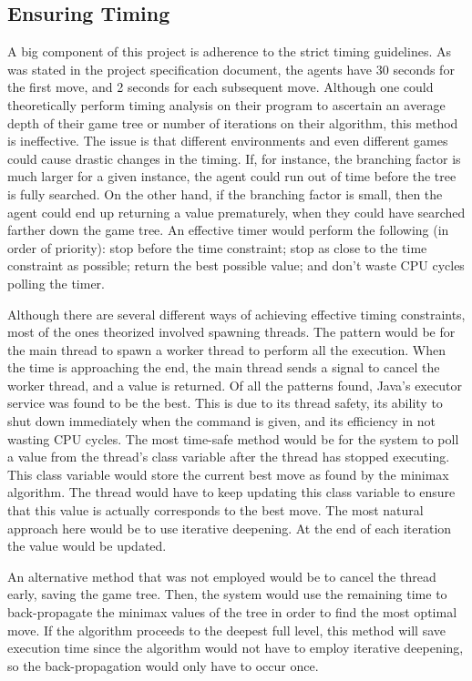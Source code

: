 \documentclass[]{article}
\begin{document}
\subsection{Ensuring Timing}
A big component of this project is adherence to the strict timing guidelines. As was stated in the project specification document, the agents have 30 seconds for the first move, and 2 seconds for each subsequent move. Although one could theoretically perform timing analysis on their program to ascertain an average depth of their game tree or number of iterations on their algorithm, this method is ineffective. The issue is that different environments and even different games could cause drastic changes in the timing. If, for instance, the branching factor is much larger for a given instance, the agent could run out of time before the tree is fully searched. On the other hand, if the branching factor is small, then the agent could end up returning a value prematurely, when they could have searched farther down the game tree. An effective timer would perform the following (in order of priority): stop before the time constraint; stop as close to the time constraint as possible; return the best possible value; and don't waste CPU cycles polling the timer.

Although there are several different ways of achieving effective timing constraints, most of the ones theorized involved spawning threads. The pattern would be for the main thread to spawn a worker thread to perform all the execution. When the time is approaching the end, the main thread sends a signal to cancel the worker thread, and a value is returned. Of all the patterns found, Java's executor service was found to be the best. This is due to its thread safety, its ability to shut down immediately when the command is given, and its efficiency in not wasting CPU cycles. The most time-safe method would be for the system to poll a value from the thread's class variable after the thread has stopped executing. This class variable would store the current best move as found by the minimax algorithm. The thread would have to keep updating this class variable to ensure that this value is actually corresponds to the best move. The most natural approach here would be to use iterative deepening. At the end of each iteration the value would be updated. 

An alternative method that was not employed would be to cancel the thread early, saving the game tree. Then, the system would use the remaining time to back-propagate the minimax values of the tree in order to find the most optimal move. If the algorithm proceeds to the deepest full level, this method will save execution time since the algorithm would not have to employ iterative deepening, so the back-propagation would only have to occur once. 
\end{document}
